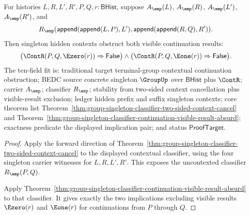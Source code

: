 \begin{theorem}
\label{thm:group-singleton-contextual-continuation-visible-result-exclusion}
For histories $L,R,L',R',P,Q,r:\mathsf{BHist}$, suppose $A_{\emp}(L)$,
$A_{\emp}(R)$, $A_{\emp}(L')$, $A_{\emp}(R')$, and
$$
R_{\emp}(\mathsf{append}(\mathsf{append}(L,P),L'),
\mathsf{append}(\mathsf{append}(R,Q),R')).
$$
Then singleton hidden contexts obstruct both visible continuation results:
$$
\bigl(\ContR(P,Q,\Ezero(r))\Rightarrow\mathsf{False}\bigr)\land
\bigl(\ContR(P,Q,\Eone(r))\Rightarrow\mathsf{False}\bigr).
$$
The ten-field fit is: traditional target terminal-group contextual continuation
obstruction; BEDC source concrete singleton $\GroupUp$ over $\mathsf{BHist}$
plus $\ContR$; carrier $A_{\emp}$; classifier $R_{\emp}$; stability from
two-sided context cancellation plus visible-result exclusion; ledger hidden
prefix and suffix singleton contexts; core theorem list
Theorem~\ref{thm:group-singleton-classifier-two-sided-context-cancel} and
Theorem~\ref{thm:group-singleton-classifier-continuation-visible-result-absurd};
exactness predicate the displayed implication pair; and status
$\mathsf{ProofTarget}$.
\end{theorem}
\begin{proof}
Apply the forward direction of
Theorem~\ref{thm:group-singleton-classifier-two-sided-context-cancel} to the
displayed contextual classifier, using the four singleton carrier witnesses for
$L,R,L',R'$. This exposes the uncontexted classifier $R_{\emp}(P,Q)$.

Apply Theorem~\ref{thm:group-singleton-classifier-continuation-visible-result-absurd}
to that classifier. It gives exactly the two implications excluding visible
results $\Ezero(r)$ and $\Eone(r)$ for continuations from $P$ through $Q$.
\end{proof}







